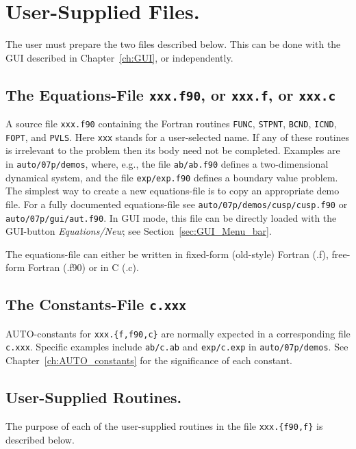 \documentclass[12pt]{report}
\begin{document}
\chapter{ User-Supplied Files.} \label{ch:User_supplied_files}
The user must prepare the two files described below.
This can be done with the GUI described in Chapter~\ref{ch:GUI}, 
or independently.

\section{ The Equations-File {\tt xxx.f90}, or {\tt xxx.f}, or {\tt xxx.c}} 
A source file {\tt xxx.f90} containing the Fortran routines
{\tt FUNC}, {\tt STPNT}, {\tt BCND}, {\tt ICND}, {\tt FOPT}, and {\tt PVLS}.
Here {\tt xxx} stands for a user-selected name. 
If any of these routines is irrelevant 
to the problem then its body need not be completed.
Examples are in {\tt auto/07p/demos}, where, e.g.,
the file {\tt ab/ab.f90} defines a two-dimensional dynamical system,
and the file {\tt exp/exp.f90} defines a boundary value problem.
The simplest way to create a new equations-file is to copy 
an appropriate demo file.
For a fully documented equations-file see
{\tt auto/07p/demos/cusp/cusp.f90} or {\tt auto/07p/gui/aut.f90}.
In GUI mode, this file can be directly loaded with the GUI-button 
{\it Equations/New}; see Section~\ref{sec:GUI_Menu_bar}.
 
The equations-file can either be written in fixed-form (old-style)
Fortran (.f), free-form Fortran (.f90) or in C (.c).

\section{ The Constants-File {\tt c.xxx}} 
{\cal AUTO}-constants for {\tt xxx.\{f,f90,c\}} are normally expected 
in a corresponding file {\tt c.xxx}.
Specific examples include {\tt ab/c.ab}
and {\tt exp/c.exp} in {\tt auto/07p/demos}.
See Chapter~\ref{ch:AUTO_constants}
for the significance of each constant.

\newpage
\section{ User-Supplied Routines.} \label{sec: User_supplied_routines}
The purpose of each of the user-supplied routines in
the file {\tt xxx.\{f90,f\}} is described below.
  
\end{document}
